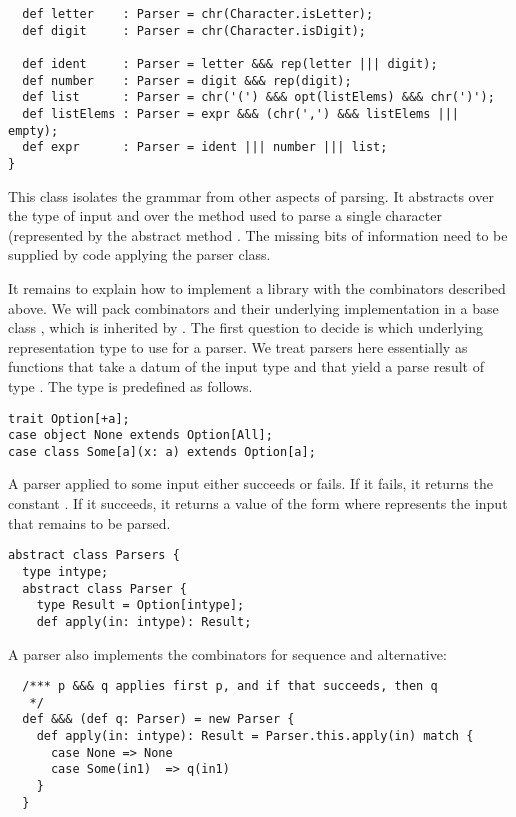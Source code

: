 {\begin{lstlisting}
  def letter    : Parser = chr(Character.isLetter);
  def digit     : Parser = chr(Character.isDigit);

  def ident     : Parser = letter &&& rep(letter ||| digit);
  def number    : Parser = digit &&& rep(digit);
  def list      : Parser = chr('(') &&& opt(listElems) &&& chr(')');
  def listElems : Parser = expr &&& (chr(',') &&& listElems ||| empty);
  def expr      : Parser = ident ||| number ||| list;
}
\end{lstlisting}
This class isolates the grammar from other aspects of parsing. It
abstracts over the type of input 
and over the method used to parse a single character
(represented by the abstract method . The missing bits of information need to be supplied by code
applying the parser class.

It remains to explain how to implement a library with the combinators
described above. We will pack combinators and their underlying
implementation in a base class , which is inherited by
.  The first question to decide is which underlying
representation type to use for a parser. We treat parsers here
essentially as functions that take a datum of the input type
 and that yield a parse result of type
.  The  type is predefined as
follows.
\begin{lstlisting}
trait Option[+a];
case object None extends Option[All];
case class Some[a](x: a) extends Option[a];
\end{lstlisting}
A parser applied to some input either succeeds or fails. If it fails,
it returns the constant . If it succeeds, it returns a
value of the form  where  represents the
input that remains to be parsed.
\begin{lstlisting}
abstract class Parsers {
  type intype;
  abstract class Parser {
    type Result = Option[intype];  
    def apply(in: intype): Result;
\end{lstlisting}
A parser also implements the combinators
for sequence and alternative:
\begin{lstlisting}
  /*** p &&& q applies first p, and if that succeeds, then q
   */
  def &&& (def q: Parser) = new Parser {
    def apply(in: intype): Result = Parser.this.apply(in) match {
      case None => None
      case Some(in1)  => q(in1)
    }
  }


\end{lstlisting}}
